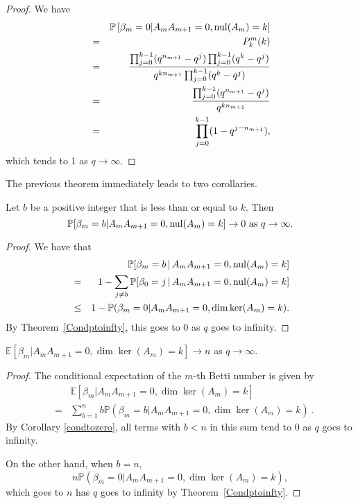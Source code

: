 \begin{proof}\label{Condptoinfty}
We have
	\begin{eqnarray*}
	&&\mathbb{P}\left[\beta_m = 0|A_{m}A_{m+1} = 0, \mathrm{nul}(A_{m}) = k \right]\\ 
    &=& P^m_k(k)\\
    &=& \frac{\prod_{j=0}^{k-1}(q^{n_{m+1}}-q^{j})
		\prod_{j=0}^{k-1}(q^k - q^j )}
		{q^{kn_{m+1}} \prod_{j=0}^{k-1} (q^k-q^j)}\\
		&=& \frac{\prod_{j=0}^{k-1}(q^{n_{m+1}} - q^j)}
		{q^{kn_{m+1}}} \\
		&=& \prod_{j=0}^{k-1} (1-q^{j-n_{m+1}}),
	\end{eqnarray*}
which tends to 1 as $q\to\infty$.  
\end{proof}

The previous theorem immediately leads to two corollaries.  

\begin{corollary}\label{condtozero}
Let $b$ be a positive integer that is less than or equal to $k$. Then 
\[
\mathbb{P}[\beta_m = b| A_{m}A_{m+1} = 0, \mathrm{nul}(A_{m}) = k ] \to 0 \textrm{ as } q\to\infty.
\]
\end{corollary}
\begin{proof}
We have that
	\begin{eqnarray*}
	&&\mathbb{P}[\beta_m = b \,|\, A_{m}A_{m+1} = 0, \mathrm{nul}(A_{m}) = k ]\\
    &=& 1 - \sum_{j\neq b}\mathbb{P}[\beta_0 = j \,|\, A_{m}A_{m+1} = 0, \mathrm{nul}(A_{m}) = k ]\\
    &\leq& 1 - \mathbb{P}(\beta_m = 0|A_{m}A_{m+1} = 0, \dim\ker(A_{m}) = k ).
	\end{eqnarray*}
By Theorem~\ref{Condptoinfty}, this goes to $0$ as $q$ goes to infinity.
\end{proof}

\begin{corollary}
$\mathbb{E}[\beta_m | A_{m}A_{m+1} = 0, \dim\ker(A_{m}) = k ] \to n$ as $q\to\infty$.
\begin{proof}
The conditional expectation of the $m$-th Betti number is given by
	\begin{eqnarray*}
	& & \mathbb{E}[\beta_m | A_{m}A_{m+1} = 0, \dim\ker(A_{m}) = k ]\\
	&=& \sum_{b=1}^n b \mathbb{P}(\beta_m = b | A_{m}A_{m+1} = 0, \dim\ker(A_{m}) = k ) \, .
	\end{eqnarray*}
By Corollary \ref{condtozero}, all terms with $b< n$ in this sum tend to 
$0$ as $q$ goes to infinity. 

On the other hand, when $b=n$, 
\[
n\mathbb{P}(\beta_m=0| A_{m}A_{m+1} = 0, \dim\ker(A_{m}) = k ),
\]
which goes to $n$ has $q$ goes to infinity by Theorem~\ref{Condptoinfty}.
\end{proof}
\end{corollary}
